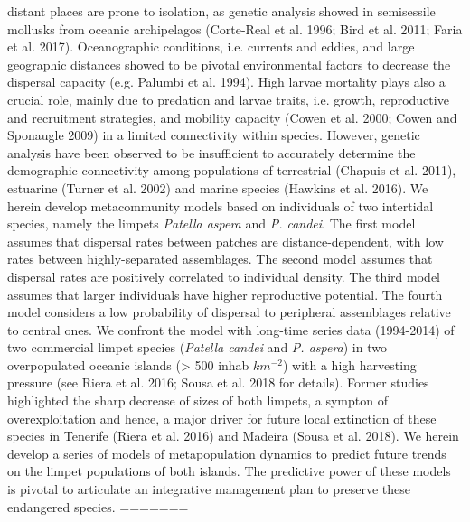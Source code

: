 \documentclass[12pt]{article}
\begin{document}
\begin{flushleft}
distant places are prone to isolation, as genetic analysis showed in
semisessile mollusks from oceanic archipelagos (Corte-Real et
al. 1996; Bird et al. 2011; Faria et al. 2017). Oceanographic
conditions, i.e. currents and eddies, and large geographic distances
showed to be pivotal environmental factors to decrease the dispersal
capacity (e.g. Palumbi et al. 1994). High larvae mortality plays also
a crucial role, mainly due to predation and larvae traits,
i.e. growth, reproductive and recruitment strategies, and mobility
capacity (Cowen et al. 2000; Cowen and Sponaugle 2009) in a limited
connectivity within species. However, genetic analysis have been
observed to be insufficient to accurately determine the demographic
connectivity among populations of terrestrial (Chapuis et al. 2011),
estuarine (Turner et al. 2002) and marine species (Hawkins et
al. 2016).  We herein develop metacommunity models based on
individuals of two intertidal species, namely the limpets
\textit{Patella aspera} and \textit{P. candei}. The first model
assumes that dispersal rates between patches are distance-dependent,
with low rates between highly-separated assemblages. The second model
assumes that dispersal rates are positively correlated to individual
density. The third model assumes that larger individuals have higher
reproductive potential. The fourth model considers a low probability
of dispersal to peripheral assemblages relative to central ones. We
confront the model with long-time series data (1994-2014) of two
commercial limpet species (\textit{Patella candei} and
\textit{P. aspera}) in two overpopulated oceanic islands (> 500 inhab
$km^{-2}$) with a high harvesting pressure (see Riera et al. 2016; Sousa
et al. 2018 for details). Former studies highlighted the sharp
decrease of sizes of both limpets, a sympton of overexploitation and
hence, a major driver for future local extinction of these species in
Tenerife (Riera et al. 2016) and Madeira (Sousa et al. 2018). We
herein develop a series of models of metapopulation dynamics to
predict future trends on the limpet populations of both islands. The
predictive power of these models is pivotal to articulate an
integrative management plan to preserve these endangered species.
=======

\end{flushleft}
\end{document}
